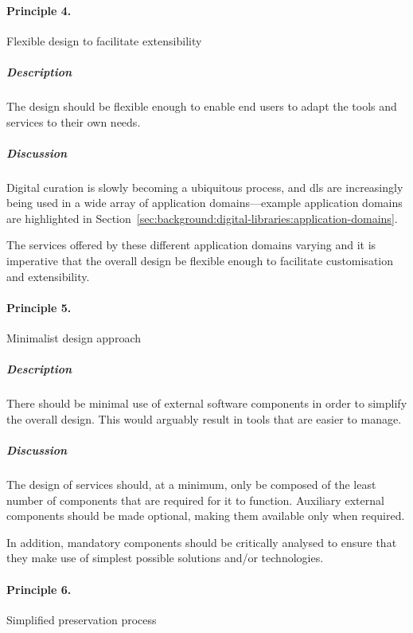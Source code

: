 \paragraph{Principle 4.} Flexible design to facilitate extensibility

\subparagraph{Description} The design should be flexible enough to enable end
users to adapt the tools and services to their own needs.


\subparagraph{Discussion} Digital curation is slowly becoming a ubiquitous
process, and \glspl{dl} are increasingly being used in a wide array of
application domains---example application domains are highlighted in Section~\ref{sec:background:digital-libraries:application-domains}. 

The services offered by these different application domains varying and it is
imperative that the overall design be flexible enough to facilitate
customisation and extensibility.

\paragraph{Principle 5.} Minimalist design approach

\subparagraph{Description} There should be minimal use of external software
components in order to simplify the overall design. This would arguably result
in tools that are easier to manage.


\subparagraph{Discussion} The design of services should, at a minimum, only be
composed of the least number of components that are required for it to
function. Auxiliary external components should be made optional, making them
available only when required.

In addition, mandatory components should be critically analysed to ensure that
they make use of simplest possible solutions and/or technologies.

\paragraph{Principle 6.} Simplified preservation process

